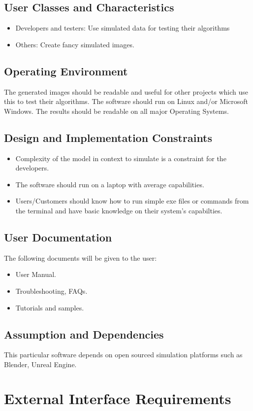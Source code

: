 \documentclass[a4paper,12pt]{article}
\begin{document}
\subsection{User Classes and Characteristics}
\begin{itemize}
\item Developers and testers: Use simulated data for testing their algorithms
\item Others: Create fancy simulated images.
\end{itemize}
\subsection{Operating Environment}
The generated images should be readable and useful for other projects which use this to test their algorithms. The software should run on Linux and/or Microsoft Windows. The results should be readable on all major Operating Systems.
\subsection{Design and Implementation Constraints}
\begin{itemize}
\item Complexity of the model in context to simulate is a constraint for the developers.
\item The software should run on a laptop with average capabilities.
\item Users/Customers should know how to run simple exe files or commands from the terminal and have basic knowledge on their system's capabilties.

\end{itemize}
\subsection{User Documentation}
The following documents will be given to the user:
\begin{itemize}
\item User Manual.
\item Troubleshooting, FAQs.
\item Tutorials and samples.
\end{itemize}
\subsection{Assumption and Dependencies}
This particular software depends on open sourced simulation platforms such as Blender, Unreal Engine.
\newpage
\section{External Interface Requirements}
\end{document}
